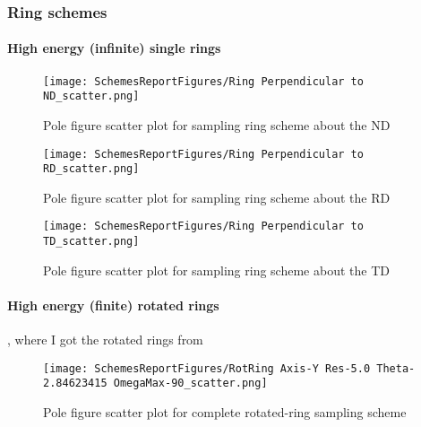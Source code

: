 \documentclass{article}
\begin{document}
\subsubsection{Ring schemes}

\paragraph{High energy (infinite) single rings}

\begin{figure}[ht]
    \centering
    \texttt{[image: SchemesReportFigures/Ring Perpendicular to ND\_scatter.png]}
    \caption{Pole figure scatter plot for sampling ring scheme about the ND}
\end{figure}

\begin{figure}[ht]
    \centering
    \texttt{[image: SchemesReportFigures/Ring Perpendicular to RD\_scatter.png]}
    \caption{Pole figure scatter plot for sampling ring scheme about the RD}
\end{figure}

\begin{figure}[ht]
    \centering
    \texttt{[image: SchemesReportFigures/Ring Perpendicular to TD\_scatter.png]}
    \caption{Pole figure scatter plot for sampling ring scheme about the TD}
\end{figure}




\paragraph{High energy (finite) rotated rings}



\cite{phan_micromechanical_2019}, where I got the rotated rings from

\begin{figure}[ht]
    \centering
    \texttt{[image: SchemesReportFigures/RotRing Axis-Y Res-5.0 Theta-2.84623415 OmegaMax-90\_scatter.png]}
    \caption{Pole figure scatter plot for complete rotated-ring sampling scheme}
\end{figure}
\end{document}
